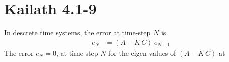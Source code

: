 \section{Kailath 4.1-9}
In descrete time systems, the error at time-step $N$ is 
\begin{align*}
    e_{N} &= \left(A - K\,C\right)\,e_{N-1}
\end{align*}
The error $e_N = 0$, at time-step $N$ for the eigen-values of $\left(A - K\,C\right)$ at 
